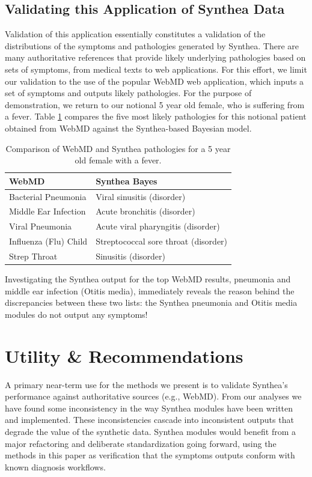 \documentclass[11pt]{article}
\begin{document}
\subsection{Validating this Application of Synthea Data}

Validation of this application essentially constitutes a validation of the distributions of the symptoms and pathologies generated by Synthea.  There are many authoritative references that provide likely underlying pathologies based on sets of symptoms, from medical texts to web applications.  For this effort, we limit our validation to the use of the popular WebMD \citep{webmd} web application, which inputs a set of symptoms and outputs likely pathologies.  For the purpose of demonstration, we return to our notional 5 year old female, who is suffering from a fever.  Table \ref{table: validate} compares the five most likely pathologies for this notional patient obtained from WebMD against the Synthea-based Bayesian model.

\begin{table}[!hbt]\centering
\begin{tabular}{l|l}
WebMD & Synthea Bayes \\ \hline
Bacterial Pneumonia & Viral sinusitis (disorder) \\
Middle Ear Infection & Acute bronchitis (disorder) \\
Viral Pneumonia & Acute viral pharyngitis (disorder) \\
Influenza (Flu) Child & Streptococcal sore throat (disorder) \\
Strep Throat & Sinusitis (disorder) \\
\end{tabular}
\caption{Comparison of WebMD and Synthea pathologies for a 5 year old female with a fever.
\label{table: validate}}
\end{table}

Investigating the Synthea output for the top WebMD results, pneumonia and middle ear infection (Otitis media), immediately reveals the reason behind the discrepancies between these two lists: the Synthea pneumonia and Otitis media modules do not output any symptoms!  

\section{Utility \& Recommendations}

A primary near-term use for the methods we present is to validate Synthea's performance against authoritative sources (e.g., WebMD).  From our analyses we have found some inconsistency in the way Synthea modules have been written and implemented.  These inconsistencies cascade into inconsistent outputs that degrade the value of the synthetic data.  Synthea modules would benefit from a major refactoring and deliberate standardization going forward, using the methods in this paper as verification that the symptoms outputs conform with known diagnosis workflows.
\end{document}
